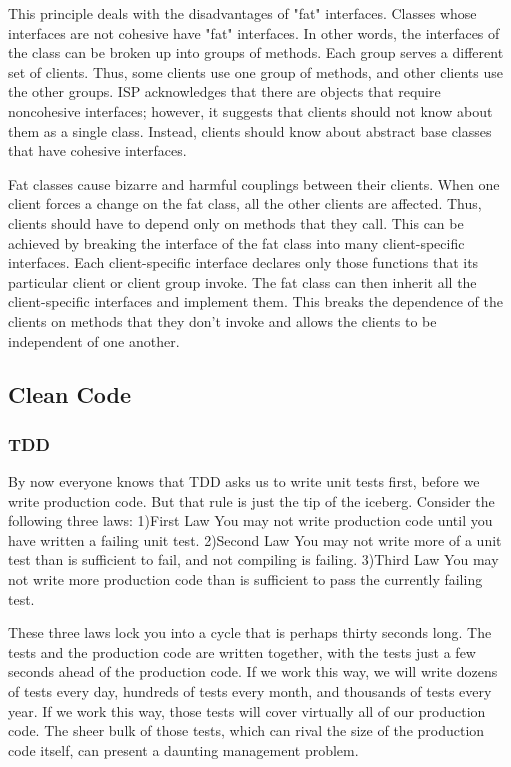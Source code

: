 \documentclass{llncs}
\begin{document}
This principle deals with the disadvantages of "fat" interfaces. 
Classes whose interfaces are not cohesive have "fat" interfaces. 
In other words, the interfaces of the class can be broken up into groups of methods. 
Each group serves a different set of clients.
Thus, some clients use one group of methods, and other clients use the other groups.
ISP acknowledges that there are objects that require noncohesive interfaces; however, it suggests that clients should not know about them as a single class.
Instead, clients should know about abstract base classes that have cohesive interfaces.

Fat classes cause bizarre and harmful couplings between their clients. 
When one client forces a change on the fat class, all the other clients are affected. 
Thus, clients should have to depend only on methods that they call. 
This can be achieved by breaking the interface of the fat class into many client-specific interfaces.
Each client-specific interface declares only those functions that its particular client or client group invoke. 
The fat class can then inherit all the client-specific interfaces and implement them. 
This breaks the dependence of the clients on methods that they don't invoke and allows the clients to be independent of one another.

\subsection{Clean Code \cite{MartinClean}}

\subsubsection{TDD}
By now everyone knows that TDD asks us to write unit tests first, before we write production code. 
But that rule is just the tip of the iceberg. 
Consider the following three laws:
1)First Law You may not write production code until you have written a failing unit test.
2)Second Law You may not write more of a unit test than is sufficient to fail, and not compiling is failing.
3)Third Law You may not write more production code than is sufficient to pass the currently failing test.

These three laws lock you into a cycle that is perhaps thirty seconds long.
The tests and the production code are written together, with the tests just a few seconds ahead of the production code. 
If we work this way, we will write dozens of tests every day, hundreds of tests every month, and thousands of tests every year. 
If we work this way, those tests will cover virtually all of our production code. 
The sheer bulk of those tests, which can rival the size of the production code itself, can present a daunting management problem.
\end{document}
